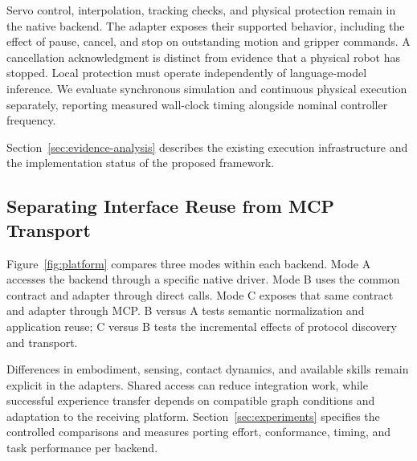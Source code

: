 \documentclass[10pt,twocolumn,letterpaper]{article}
\begin{document}
Servo control, interpolation, tracking checks, and physical protection remain in the native backend. The adapter exposes their supported behavior, including the effect of pause, cancel, and stop on outstanding motion and gripper commands. A cancellation acknowledgment is distinct from evidence that a physical robot has stopped. Local protection must operate independently of language-model inference. We evaluate synchronous simulation and continuous physical execution separately, reporting measured wall-clock timing alongside nominal controller frequency.

Section~\ref{sec:evidence-analysis} describes the existing execution infrastructure and the implementation status of the proposed framework.

\subsection{Separating Interface Reuse from MCP Transport}

Figure~\ref{fig:platform} compares three modes within each backend. Mode A accesses the backend through a specific native driver. Mode B uses the common contract and adapter through direct calls. Mode C exposes that same contract and adapter through MCP. B versus A tests semantic normalization and application reuse; C versus B tests the incremental effects of protocol discovery and transport.

Differences in embodiment, sensing, contact dynamics, and available skills remain explicit in the adapters. Shared access can reduce integration work, while successful experience transfer depends on compatible graph conditions and adaptation to the receiving platform. Section~\ref{sec:experiments} specifies the controlled comparisons and measures porting effort, conformance, timing, and task performance per backend.


\end{document}
